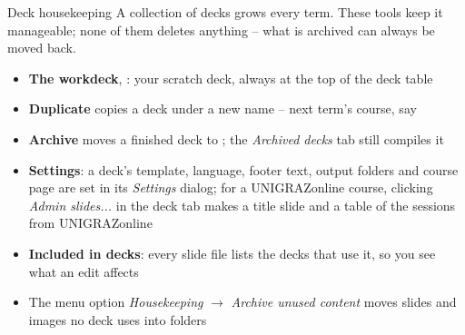 
\begin{standardframe}{Deck housekeeping}
	\small
	A collection of decks grows every term. These tools keep it manageable;
	none of them deletes anything -- what is archived can always be moved back.
	\par\medskip
	\begin{itemize}
		\item \textbf{The workdeck}, : your scratch deck, always at the top of the deck table
		\item \textbf{Duplicate} copies a deck under a new name -- next term's course, say
		\item \textbf{Archive} moves a finished deck to ; the \emph{Archived decks} tab still compiles it
		\item \textbf{Settings}: a deck's template, language, footer text, output folders and course page are set in its \emph{Settings} dialog; for a UNIGRAZonline course, clicking \emph{Admin slides...} in the deck tab makes a title slide and a table of the sessions from UNIGRAZonline
		\item \textbf{Included in decks}: every slide file lists the decks that use it, so you see what an edit affects
		\item The menu option \emph{Housekeeping} $\rightarrow$ \emph{Archive unused content} moves slides and images no deck uses into  folders
	\end{itemize}
\end{standardframe}
